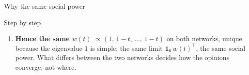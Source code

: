 \documentclass[10pt, aspectratio=169]{beamer}
\begin{document}
\begin{frame}[label=m-fdg-why,t]{Why the same social power}
{\begin{block}{Step by step}
\begin{enumerate}
            reads $w_j = \sum_i w_i\, a_{ij}(t)$. Suppose agents $2, \dots, 6$ have the
            same social power $b$, as at $t = 0$.
            \begin{itemize}
              \item Column $1$: agent~$1$ listens to itself with weight $t$, and the others
                    listen to it with total weight $1$, as at $t = 0$. So
                    $w_1 = t\, w_1 + b$, i.e.\ $b = (1-t)\, w_1$.
              \item Column $j \neq 1$: agent~$1$ listens to $j$ with weight
                    $(1-t)\, a_{1j}(0)$; multiplied by $w_1 = b/(1-t)$, this gives
                    $b\, a_{1j}(0)$, the same term as at $t = 0$, when agent~$1$ had the
                    same social power $b$ as the others. So every column $j \neq 1$ is as at
                    $t = 0$ and gives $w_j = b$: the supposition holds, on both networks,
                    whether agent~$1$ listens to one agent or to two.
            \end{itemize}
      \item \textbf{Hence the same $w(t)$} $\propto (1,\, 1-t,\, \dots,\, 1-t)$ on both
            networks, unique because the eigenvalue $1$ is simple: the same limit
            $\mathbf{1}_6\, w(t)^\top$, the same social power. What differs between the two
            networks decides how the opinions converge, not where.
    \end{enumerate}
  \end{block}}
\end{frame}
\end{document}
